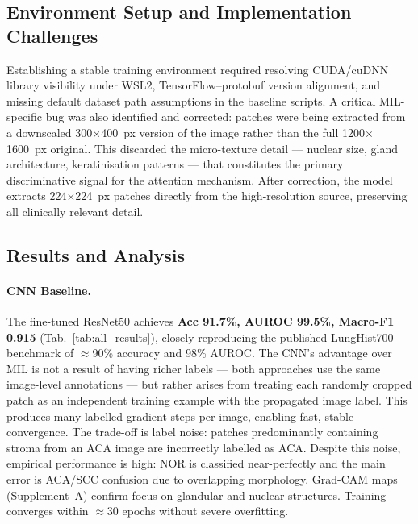 \documentclass[10pt,twocolumn,letterpaper]{article}
\begin{document}
\subsection{Environment Setup and Implementation Challenges}
Establishing a stable training environment required resolving CUDA/cuDNN library visibility under WSL2, TensorFlow--protobuf version alignment, and missing default dataset path assumptions in the baseline scripts. A critical MIL-specific bug was also identified and corrected: patches were being extracted from a downscaled 300$\times$400~px version of the image rather than the full 1200$\times$1600~px original. This discarded the micro-texture detail — nuclear size, gland architecture, keratinisation patterns — that constitutes the primary discriminative signal for the attention mechanism. After correction, the model extracts 224$\times$224~px patches directly from the high-resolution source, preserving all clinically relevant detail.

\subsection{Results and Analysis}

\paragraph{CNN Baseline.}
The fine-tuned ResNet50 achieves \textbf{Acc 91.7\%, AUROC 99.5\%, Macro-F1 0.915} (Tab.~\ref{tab:all_results}), closely reproducing the published LungHist700 benchmark of $\approx$90\% accuracy and 98\% AUROC. The CNN's advantage over MIL is not a result of having richer labels — both approaches use the same image-level annotations — but rather arises from treating each randomly cropped patch as an independent training example with the propagated image label. This produces many labelled gradient steps per image, enabling fast, stable convergence. The trade-off is label noise: patches predominantly containing stroma from an ACA image are incorrectly labelled as ACA. Despite this noise, empirical performance is high: NOR is classified near-perfectly and the main error is ACA/SCC confusion due to overlapping morphology. Grad-CAM maps (Supplement~A) confirm focus on glandular and nuclear structures. Training converges within $\approx$30 epochs without severe overfitting.
\end{document}
